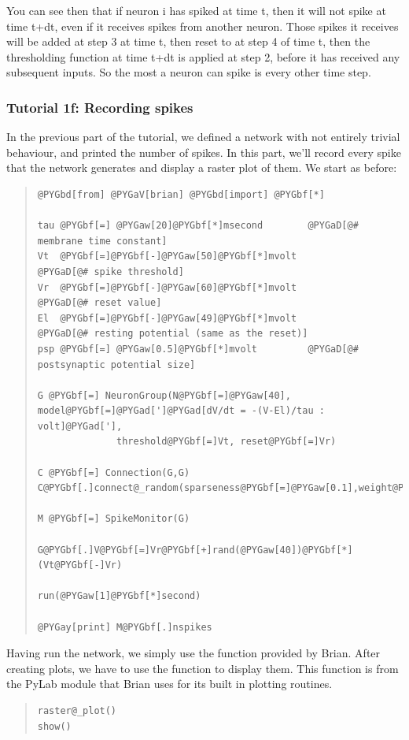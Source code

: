 \documentclass[letterpaper,10pt,english]{manual}
\begin{document}
You can see then that if neuron i has spiked at time t, then it
will not spike at time t+dt, even if it receives spikes from
another neuron. Those spikes it receives will be added at step
3 at time t, then reset to  at step 4 of time t, then the
thresholding function at time t+dt is applied at step 2, before
it has received any subsequent inputs. So the most a neuron
can spike is every other time step.

\resetcurrentobjects
\hypertarget{--doc-tutorial_1f_recording_spikes}{}

\subsubsection{Tutorial 1f: Recording spikes}

In the previous part of the tutorial, we defined a network with
not entirely trivial behaviour, and printed the number of spikes.
In this part, we'll record every spike that the network generates
and display a raster plot of them. We start as before:
\begin{quote}

\begin{Verbatim}[commandchars=@\[\]]
@PYGbd[from] @PYGaV[brian] @PYGbd[import] @PYGbf[*]

tau @PYGbf[=] @PYGaw[20]@PYGbf[*]msecond        @PYGaD[@# membrane time constant]
Vt  @PYGbf[=]@PYGbf[-]@PYGaw[50]@PYGbf[*]mvolt          @PYGaD[@# spike threshold]
Vr  @PYGbf[=]@PYGbf[-]@PYGaw[60]@PYGbf[*]mvolt          @PYGaD[@# reset value]
El  @PYGbf[=]@PYGbf[-]@PYGaw[49]@PYGbf[*]mvolt          @PYGaD[@# resting potential (same as the reset)]
psp @PYGbf[=] @PYGaw[0.5]@PYGbf[*]mvolt         @PYGaD[@# postsynaptic potential size]

G @PYGbf[=] NeuronGroup(N@PYGbf[=]@PYGaw[40], model@PYGbf[=]@PYGad[']@PYGad[dV/dt = -(V-El)/tau : volt]@PYGad['],
              threshold@PYGbf[=]Vt, reset@PYGbf[=]Vr)

C @PYGbf[=] Connection(G,G)
C@PYGbf[.]connect@_random(sparseness@PYGbf[=]@PYGaw[0.1],weight@PYGbf[=]psp)

M @PYGbf[=] SpikeMonitor(G)

G@PYGbf[.]V@PYGbf[=]Vr@PYGbf[+]rand(@PYGaw[40])@PYGbf[*](Vt@PYGbf[-]Vr)

run(@PYGaw[1]@PYGbf[*]second)

@PYGay[print] M@PYGbf[.]nspikes
\end{Verbatim}
\end{quote}

Having run the network, we simply use the \hyperlink{brian.raster_plot}{} function
provided by Brian. After creating plots, we have to use the
 function to display them. This function is from the
PyLab module that Brian uses for its built in plotting
routines.
\begin{quote}

\begin{Verbatim}[commandchars=@\[\]]
raster@_plot()
show()
\end{Verbatim}
\end{quote}
\end{document}
